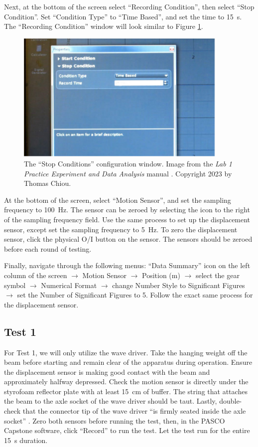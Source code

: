 \documentclass[12 pt]{report}
\begin{document}
Next, at the bottom of the screen select ``Recording Condition'', then select ``Stop Condition''. Set ``Condition Type'' to ``Time Based'', and set the time to \qty{15}{\s}. The ``Recording Condition'' window will look similar to Figure \ref{fig:stop_conditions}. 

\begin{figure}[htbp]
\centering
\includegraphics[width=4in]{images/Stop_Conditions}
\caption{The ``Stop Conditions'' configuration window. Image from the \textit{Lab 1 Practice Experiment and Data Analysis} manual \cite{lab_procedures}. Copyright 2023 by Thomas Chiou.}
\label{fig:stop_conditions}
\end{figure}

At the bottom of the screen, select ``Motion Sensor'', and set the sampling frequency to \qty{100}{\hertz}. The sensor can be zeroed by selecting the icon to the right of the sampling frequency field. Use the same process to set up the displacement sensor, except set the sampling frequency to \qty{5}{\hertz}. To zero the displacement sensor, click the physical O/I button on the sensor. The sensors should be zeroed before each round of testing.

Finally, navigate through the following menus: ``Data Summary'' icon on the left column of the screen $\rightarrow$ Motion Sensor $\rightarrow$ Position (m) $\rightarrow$ select the gear symbol $\rightarrow$ Numerical Format $\rightarrow$ change Number Style to Significant Figures $\rightarrow$ set the Number of Significant Figures to \num{5}. Follow the exact same process for the displacement sensor.

\subsection{Test 1} \label{procedures-test_1}
For Test 1, we will only utilize the wave driver. Take the hanging weight off the beam before starting and remain clear of the apparatus during operation. Ensure the displacement sensor is making good contact with the beam and approximately halfway depressed. Check the motion sensor is directly under the styrofoam reflector plate with at least \qty{15}{\cm} of buffer. The string that attaches the beam to the axle socket of the wave driver should be taut. Lastly, double-check that the connector tip of the wave driver ``is firmly seated inside the axle socket'' \cite{lab_procedures}. Zero both sensors before running the test, then, in the PASCO Capstone software, click ``Record'' to run the test. Let the test run for the entire \qty{15}{\s} duration. 
\end{document}
